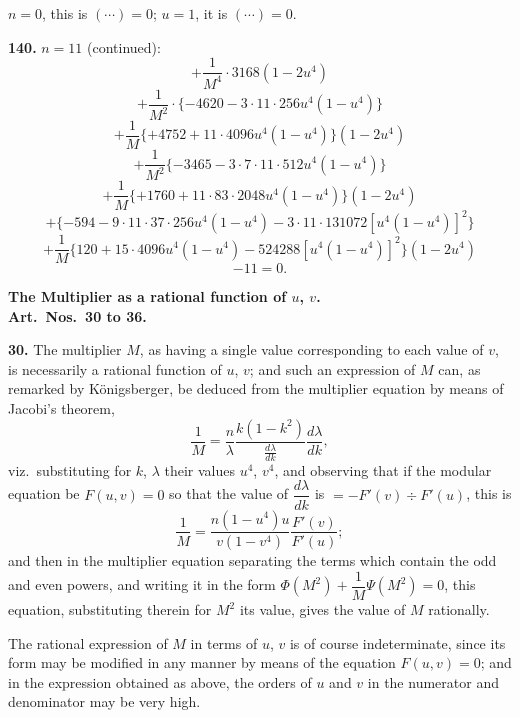 \documentclass[11pt,a4paper]{article}
\theoremstyle{plain}
\begin{document}
$n = 0$, this is $(\cdots) = 0$; $u = 1$, it is $(\cdots) = 0$.


\noindent\textbf{140.} $n = 11$ (continued):
\[
+ \frac{1}{M^4} \cdot 3168(1 - 2u^4)
\]
\[
+ \frac{1}{M^2} \cdot \{-4620 - 3 \cdot 11 \cdot 256u^4(1 - u^4)\}
\]
\[
+ \frac{1}{M}\{+4752 + 11 \cdot 4096u^4(1 - u^4)\}(1 - 2u^4)
\]
\[
+ \frac{1}{M^2}\{-3465 - 3 \cdot 7 \cdot 11 \cdot 512u^4(1 - u^4)\}
\]
\[
+ \frac{1}{M}\{+1760 + 11 \cdot 83 \cdot 2048u^4(1 - u^4)\}(1 - 2u^4)
\]
\[
+ \{-594 - 9 \cdot 11 \cdot 37 \cdot 256u^4(1 - u^4) - 3 \cdot 11 \cdot 131072[u^4(1 - u^4)]^2\}
\]
\[
+ \frac{1}{M}\{120 + 15 \cdot 4096u^4(1 - u^4) - 524288[u^4(1 - u^4)]^2\}(1 - 2u^4)
\]
\[
- 11 = 0.
\]

\medskip
\noindent\textbf{The Multiplier as a rational function of $u$, $v$.}\\
\textbf{Art.~Nos.~30 to 36.}

\medskip
\noindent\textbf{30.} The multiplier $M$, as having a single value corresponding to each value of $v$, is necessarily a rational function of $u$, $v$; and such an expression of $M$ can, as remarked by K\"onigsberger, be deduced from the multiplier equation by means of Jacobi's theorem,
\[
\frac{1}{M} = \frac{n}{\lambda}\frac{k(1 - k^2)}{\frac{d\lambda}{dk}}\frac{d\lambda}{dk},
\]
viz.\ substituting for $k$, $\lambda$ their values $u^4$, $v^4$, and observing that if the modular equation be $F(u, v) = 0$ so that the value of $\dfrac{d\lambda}{dk}$ is $= -F'(v) \div F'(u)$, this is
\[
\frac{1}{M} = \frac{n(1 - u^4)u}{v(1 - v^4)}\frac{F'(v)}{F'(u)};
\]
and then in the multiplier equation separating the terms which contain the odd and even powers, and writing it in the form $\Phi(M^2) + \dfrac{1}{M}\Psi(M^2) = 0$, this equation, substituting therein for $M^2$ its value, gives the value of $M$ rationally.

The rational expression of $M$ in terms of $u$, $v$ is of course indeterminate, since its form may be modified in any manner by means of the equation $F(u, v) = 0$; and in the expression obtained as above, the orders of $u$ and $v$ in the numerator and denominator may be very high.
\end{document}
